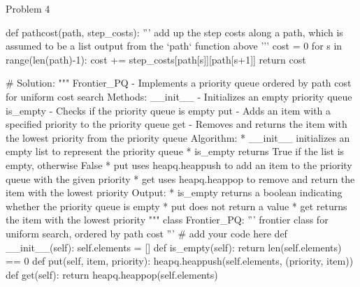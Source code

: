 \begin{problem}{Problem 4}
\begin{highlight}[Solution]
\begin{code}[Python]
    def pathcost(path, step_costs):
        '''
        add up the step costs along a path, which is assumed to be a list output from the `path` function above
        '''
        cost = 0
        for s in range(len(path)-1):
            cost += step_costs[path[s]][path[s+1]]
        return cost
    
    
    # Solution:
    """ Frontier_PQ - Implements a priority queue ordered by path cost for uniform cost search
        Methods:
            __init__ - Initializes an empty priority queue
            is_empty - Checks if the priority queue is empty
            put - Adds an item with a specified priority to the priority queue
            get - Removes and returns the item with the lowest priority from the priority queue
        Algorithm:
            * __init__ initializes an empty list to represent the priority queue
            * is_empty returns True if the list is empty, otherwise False
            * put uses heapq.heappush to add an item to the priority queue with the given priority
            * get uses heapq.heappop to remove and return the item with the lowest priority
        Output:
            * is_empty returns a boolean indicating whether the priority queue is empty
            * put does not return a value
            * get returns the item with the lowest priority
    """
    class Frontier_PQ:
        ''' frontier class for uniform search, ordered by path cost '''
        # add your code here
        def __init__(self):
            self.elements = []
        def is_empty(self):
            return len(self.elements) == 0
        def put(self, item, priority):
            heapq.heappush(self.elements, (priority, item))
        def get(self):
            return heapq.heappop(self.elements)
        

\end{code}
\end{highlight}
\end{problem}
